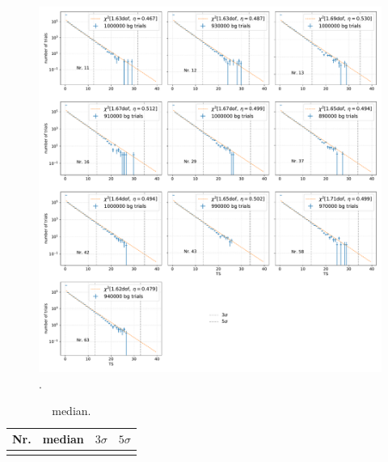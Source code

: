 \begin{figure}
    \centering
    \includegraphics[width=\linewidth]{Plots/05_csky/9_years_gfu_gold_time_dep_bg_t0.pdf}
    \caption{.}
    \label{fig:bg_trials_time_dep}
\end{figure}

\begin{table}
  \centering
  \caption[]{median\footnotemark.}
  \begin{tabular}{cccc}
    \toprule
    Nr. & median & $\num{3}\sigma$ & $\num{5}\sigma$ \\
    \toprule
      
    \toprule
    \label{tab:sigma_time_dep}
  \end{tabular}
\end{table}


